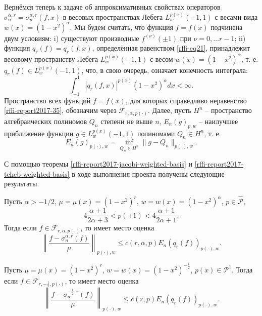 Вернёмся теперь к задаче об аппроксимативных свойствах операторов
$\sigma_{n}^{\alpha,r}=\sigma_{n}^{\alpha,r}(f,x)$ в весовых пространствах Лебега $L^{p(x)}_w(-1,1)$ с весами вида $w(x)=(1-x^2)^\alpha$. Мы будем считать, что функция $f=f(x)$ подчинена двум условиям: i)  существуют производные $f^{(\nu)}(\pm1)$ при $\nu=0,\ldots r-1$; ii) функция $q_r(f)=q_r(f,x)$, определённая равенством \eqref{rffi-eq21}, принадлежит весовому пространству Лебега $L^{p(x)}_w(-1,1)$ с весом $w(x)=(1-x^2)^\alpha$, т. е. $q_r(f)\in L^{p(x)}_w(-1,1)$, что, в свою очередь, означает конечность интеграла:
\begin{equation}\label{rffi-report2017-35}
\int_{-1}^1|q_r(f,x)|^{p(x)}(1-x^2)^\alpha dx<\infty.
\end{equation}
Пространство всех функций $f=f(x)$, для которых справедливо неравенство \eqref{rffi-report2017-35}, обозначим через $\mathcal{F}_{r,\alpha,p(\cdot)}$. Далее, пусть  $H^n$ -- пространство алгебраических полиномов $Q_n$ степени не выше $n$,  $E_n(g)_{p,w}$ -- наилучшее приближение функции $g\in  L^{p(x)}_w(-1,1)$ полиномами $Q_n\in H^n$, т. е.
\begin{equation}\label{rffi-report2017-36}
E_n(g)_{p(\cdot),w}=\inf_{Q_n\in H^n}\|g-Q_n\|_{p(\cdot),w}.
\end{equation}

С помощью теоремы \ref{rffi-report2017-jacobi-weighted-basis} и \ref{rffi-report2017-tcheb-weighted-basis} в ходе выполнения проекта получены следующие результаты.

\begin{theorem}\label{rffi-report2017-weighted-spec-est-jacobi}
Пусть $\alpha>-1/2$, $\mu=\mu(x)=(1-x^2)^r$, $w=w(x)=(1-x^2)^\alpha$, $p\in\mathcal{ \hat P}$,
$$4\frac{\alpha+1}{2\alpha+3}<p(\pm1)<4\frac{\alpha+1}{2\alpha+1}.$$
Тогда если $f\in \mathcal{ F}_{r,\alpha,p(\cdot)}$, то имеет место оценка
\begin{equation}\label{report2017-37}
\left\|\frac{f-\sigma_{n}^{\alpha,r}(f)}{\mu}\right\|_{p(\cdot),w}\le c(r,\alpha,p)E_n(q_r(f))_{p(\cdot),w}.
\end{equation}
\end{theorem}

\begin{theorem}\label{rffi-report2017-weighted-spec-est-tcheb}
Пусть $\mu=\mu(x)=(1-x^2)^r$, $w=w(x)=(1-x^2)^{-\frac12}$, $p(x) \in \mathcal{ P}^1$. Тогда если $f\in \mathcal{ F}_{r,-\frac12,p(\cdot)}$, то имеет место оценка
\begin{equation}\label{rffi-report2017-38}
\left\|\frac{f-\sigma_{n}^{-\frac12,r}(f)}{\mu}\right\|_{p(\cdot),w}\le c(r,p)E_n(q_r(f))_{p(\cdot),w}.
\end{equation}
\end{theorem} 